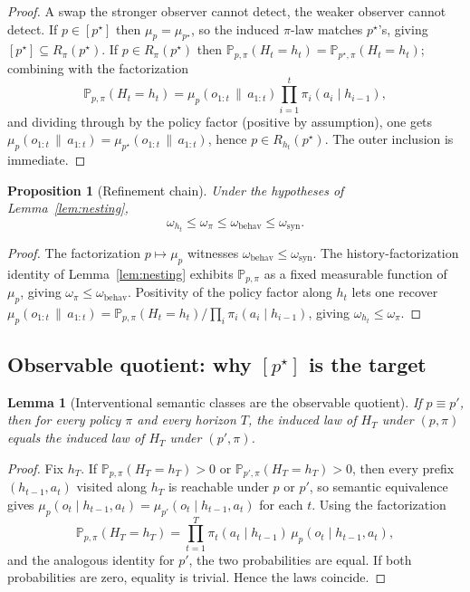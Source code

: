 \documentclass[11pt]{article}
\newtheorem{proposition}[theorem]{Proposition}
\newtheorem{lemma}[theorem]{Lemma}
\theoremstyle{definition}
\theoremstyle{remark}
\newcommand{\Prob}{\mathbb{P}}
\newcommand{\givena}{\,\|\,}
\begin{document}
\begin{proof}
A swap the stronger observer cannot detect, the weaker observer cannot detect. If $p\in[p^\star]$ then $\mu_p=\mu_{p^\star}$, so the induced $\pi$-law matches $p^\star$'s, giving $[p^\star]\subseteq R_\pi(p^\star)$. If $p\in R_\pi(p^\star)$ then $\Prob_{p,\pi}(H_t=h_t)=\Prob_{p^\star,\pi}(H_t=h_t)$; combining with the factorization
\[
\Prob_{p,\pi}(H_t=h_t)=\mu_p(o_{1:t}\givena a_{1:t})\prod_{i=1}^t \pi_i(a_i\mid h_{i-1}),
\]
and dividing through by the policy factor (positive by assumption), one gets $\mu_p(o_{1:t}\givena a_{1:t})=\mu_{p^\star}(o_{1:t}\givena a_{1:t})$, hence $p\in R_{h_t}(p^\star)$. The outer inclusion is immediate.
\end{proof}

\begin{proposition}[Refinement chain]
\label{prop:refinement-chain}
Under the hypotheses of Lemma~\ref{lem:nesting},
\[
\omega_{h_t}\le\omega_\pi\le\omega_{\mathrm{behav}}\le\omega_{\mathrm{syn}}.
\]
\end{proposition}

\begin{proof}
The factorization $p\mapsto\mu_p$ witnesses $\omega_{\mathrm{behav}}\le\omega_{\mathrm{syn}}$. The history-factorization identity of Lemma~\ref{lem:nesting} exhibits $\Prob_{p,\pi}$ as a fixed measurable function of $\mu_p$, giving $\omega_\pi\le\omega_{\mathrm{behav}}$. Positivity of the policy factor along $h_t$ lets one recover $\mu_p(o_{1:t}\givena a_{1:t})=\Prob_{p,\pi}(H_t=h_t)/\prod_i\pi_i(a_i\mid h_{i-1})$, giving $\omega_{h_t}\le\omega_\pi$.
\end{proof}

\subsection{Observable quotient: why $[p^\star]$ is the target}

\begin{lemma}[Interventional semantic classes are the observable quotient]
\label{lem:observable-quotient}
If $p\equiv p'$, then for every policy $\pi$ and every horizon $T$, the induced law of $H_T$ under $(p,\pi)$ equals the induced law of $H_T$ under $(p',\pi)$.
\end{lemma}

\begin{proof}
Fix $h_T$. If $\Prob_{p,\pi}(H_T=h_T)>0$ or $\Prob_{p',\pi}(H_T=h_T)>0$, then every prefix $(h_{t-1},a_t)$ visited along $h_T$ is reachable under $p$ or $p'$, so semantic equivalence gives $\mu_p(o_t\mid h_{t-1},a_t)=\mu_{p'}(o_t\mid h_{t-1},a_t)$ for each $t$. Using the factorization
\[
\Prob_{p,\pi}(H_T=h_T)
=
\prod_{t=1}^{T}\pi_t(a_t\mid h_{t-1})\,\mu_p(o_t\mid h_{t-1},a_t),
\]
and the analogous identity for $p'$, the two probabilities are equal. If both probabilities are zero, equality is trivial. Hence the laws coincide.
\end{proof}
\end{document}

